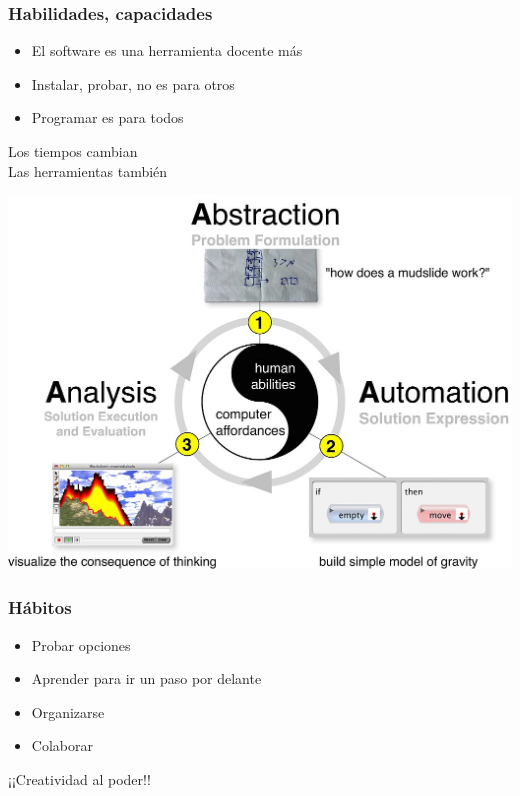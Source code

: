 \documentclass[17pt,aspectratio=169]{beamer}
\begin{document}
\begin{frame}
\frametitle{Habilidades, capacidades}

\begin{itemize}
\item El software es una herramienta docente más
\item Instalar, probar, no es para otros
\item Programar es para todos
\end{itemize}

\begin{flushright}
  Los tiempos cambian \\
  Las herramientas también \\
\end{flushright}
\end{frame}



\begin{frame}

\includegraphics[height=\textheight]{figs/computational-thinking}
\end{frame}



\begin{frame}
\frametitle{Hábitos}

\begin{itemize}
\item Probar opciones
\item Aprender para ir un paso por delante
\item Organizarse
\item Colaborar
\end{itemize}

\begin{flushright}
  ¡¡Creatividad al poder!!
\end{flushright}
\end{frame}
\end{document}
